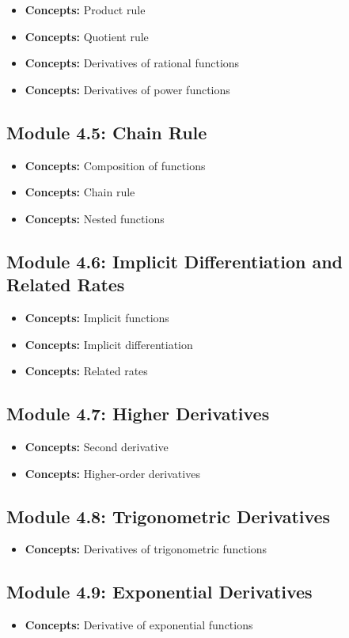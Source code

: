 \documentclass[11pt]{article}
\newcommand{\concept}[1]{\item \textbf{Concepts:} #1}
\begin{document}
\begin{itemize}
    \concept{Product rule}
    \concept{Quotient rule}
    \concept{Derivatives of rational functions}
    \concept{Derivatives of power functions}
\end{itemize}

\subsection{Module 4.5: Chain Rule}

\begin{itemize}
    \concept{Composition of functions}
    \concept{Chain rule}
    \concept{Nested functions}
\end{itemize}

\subsection{Module 4.6: Implicit Differentiation and Related Rates}

\begin{itemize}
    \concept{Implicit functions}
    \concept{Implicit differentiation}
    \concept{Related rates}
\end{itemize}

\subsection{Module 4.7: Higher Derivatives}

\begin{itemize}
    \concept{Second derivative}
    \concept{Higher-order derivatives}
\end{itemize}

\subsection{Module 4.8: Trigonometric Derivatives}

\begin{itemize}
    \concept{Derivatives of trigonometric functions}
\end{itemize}

\subsection{Module 4.9: Exponential Derivatives}

\begin{itemize}
    \concept{Derivative of exponential functions}
\end{itemize}
\end{document}

